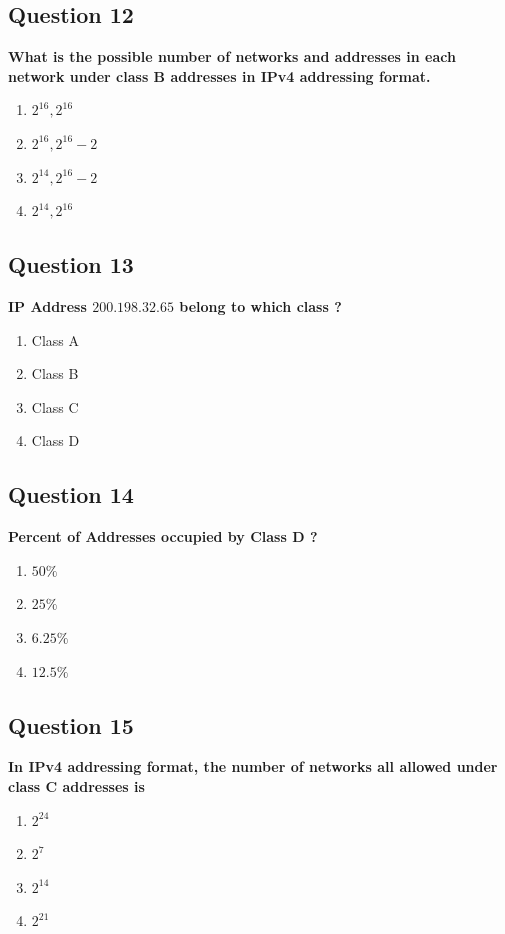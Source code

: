 \documentclass[12pt]{article}
\begin{document}
\subsection*{Question 12}
\textbf{What is the possible number of networks and addresses in each
network under class B addresses in IPv4 addressing format.}
\begin{enumerate}[label=(\Alph*)]
    \item $2^{16}, 2^{16}$
    \item $2^{16}, 2^{16} - 2$
    \item $2^{14}, 2^{16} - 2$
    \item $2^{14}, 2^{16}$
\end{enumerate}

\subsection*{Question 13}
\textbf{IP Address $200.198.32.65$ belong to which class ?}
\begin{enumerate}[label=(\Alph*)]
    \item Class A
    \item Class B
    \item Class C
    \item Class D
\end{enumerate}

\subsection*{Question 14}
\textbf{Percent of Addresses occupied by Class D ?}
\begin{enumerate}[label=(\Alph*)]
    \item $50\%$
    \item $25\%$
    \item $6.25\%$
    \item $12.5\%$
\end{enumerate}

\subsection*{Question 15}
\textbf{In IPv4 addressing format, the number of networks all allowed
under class C addresses is}
\begin{enumerate}[label=(\Alph*)]
    \item $2^{24}$
    \item $2^{7}$
    \item $2^{14}$
    \item $2^{21}$
\end{enumerate}
\end{document}
